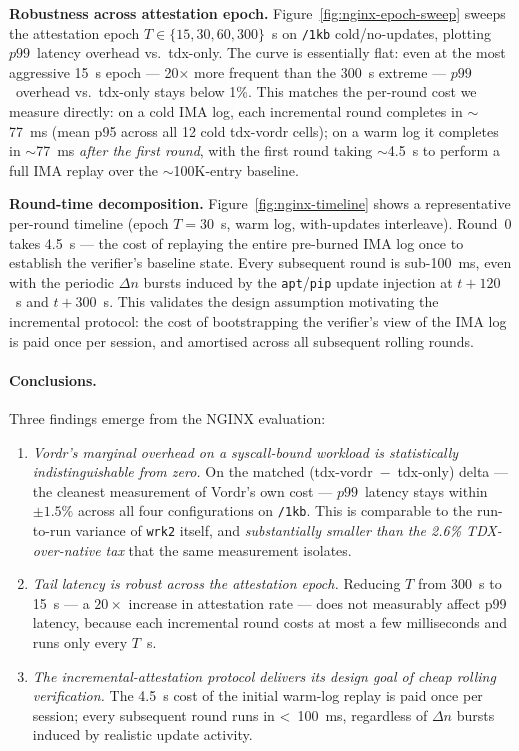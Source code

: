 \textbf{Robustness across attestation epoch.}
Figure~\ref{fig:nginx-epoch-sweep} sweeps the attestation epoch
$T \in \{15, 30, 60, 300\}$~s on \texttt{/1kb} cold/no-updates, plotting
$p99$~latency overhead vs.~tdx-only. The curve is essentially flat:
even at the most aggressive 15~s epoch — 20$\times$ more frequent than
the 300~s extreme — $p99$~overhead vs.~tdx-only stays below 1\%. This
matches the per-round cost we measure directly: on a cold IMA log,
each incremental round completes in $\sim$77~ms (mean p95 across all
12 cold tdx-vordr cells); on a warm log it completes in $\sim$77~ms
\emph{after the first round}, with the first round taking
$\sim$4.5~s to perform a full IMA replay over the
$\sim$100K-entry baseline.

\textbf{Round-time decomposition.}
Figure~\ref{fig:nginx-timeline} shows a representative per-round
timeline (epoch $T{=}30$~s, warm log, with-updates interleave). Round~0
takes 4.5~s — the cost of replaying the entire pre-burned IMA log
once to establish the verifier's baseline state. Every subsequent
round is sub-100~ms, even with the periodic $\Delta n$ bursts induced
by the \texttt{apt}/\texttt{pip} update injection at $t{+}120$~s and
$t{+}300$~s. This validates the design assumption motivating the
incremental protocol: the cost of bootstrapping the verifier's view
of the IMA log is paid once per session, and amortised across all
subsequent rolling rounds.

\paragraph{Conclusions.}
Three findings emerge from the NGINX evaluation:
\begin{enumerate}
\item \emph{Vordr's marginal overhead on a syscall-bound workload is
statistically indistinguishable from zero.} On the matched
(tdx-vordr~$-$~tdx-only) delta — the cleanest measurement of Vordr's
own cost — $p99$~latency stays within $\pm 1.5\%$ across all four
configurations on \texttt{/1kb}. This is comparable to the run-to-run
variance of \texttt{wrk2} itself, and \emph{substantially smaller than
the 2.6\% TDX-over-native tax} that the same measurement isolates.
\item \emph{Tail latency is robust across the attestation epoch.}
Reducing $T$ from 300~s to 15~s — a $20\times$ increase in attestation
rate — does not measurably affect p99 latency, because each
incremental round costs at most a few milliseconds and runs only every
$T$~s.
\item \emph{The incremental-attestation protocol delivers its design
goal of cheap rolling verification.} The 4.5~s cost of the initial
warm-log replay is paid once per session; every subsequent round
runs in \textless~100~ms, regardless of $\Delta n$ bursts induced by
realistic update activity.
\end{enumerate}

